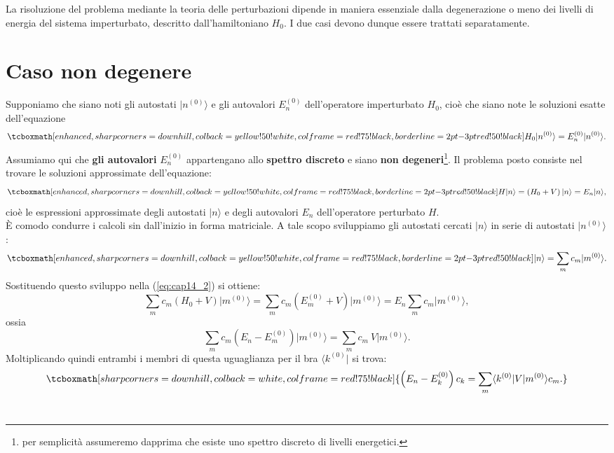 \documentclass[a4paper,12pt,oneside]{book}
\begin{document}
La risoluzione del problema mediante la teoria delle perturbazioni dipende in maniera essenziale dalla degenerazione o meno dei livelli di energia del sistema imperturbato, descritto dall'hamiltoniano $H_0$. I due casi devono dunque essere trattati separatamente.
\section{Caso non degenere}
Supponiamo che siano noti gli autostati $\vert n^{(0)} \rangle$ e gli autovalori $E_n ^{(0)}$ dell'operatore imperturbato $H_0$, cioè che siano note le soluzioni esatte dell'equazione
	\begin{equation}
		\tcboxmath[enhanced, sharp corners=downhill, colback=yellow!50!white, colframe=red!75!black, borderline={2pt}{-3pt}{red!50!black}]{
			H_0\vert n^{(0)} \rangle=E_n ^{(0)}\vert n^{(0)} \rangle.
			}
	\label{eq:cap14_1}
	\end{equation}
Assumiamo qui che \textbf{gli autovalori} $E_n ^{(0)}$ appartengano allo \textbf{spettro discreto} e siano \textbf{non degeneri}\footnote{per semplicità assumeremo dapprima che esiste uno spettro discreto di livelli energetici.}. Il problema posto consiste nel trovare le soluzioni approssimate dell'equazione:
	\begin{equation}
		\tcboxmath[enhanced, sharp corners=downhill, colback=yellow!50!white, colframe=red!75!black, borderline={2pt}{-3pt}{red!50!black}]{
			H\vert n \rangle=\left( H_0+ V \right) \vert n \rangle= E_n \vert n \rangle,
			}
	\label{eq:cap14_2}
	\end{equation}
cioè le espressioni approssimate degli autostati $\vert n \rangle$ e degli autovalori $E_n$ dell'operatore perturbato $H$.\\

È comodo condurre i calcoli sin dall'inizio in forma matriciale. A tale scopo sviluppiamo gli autostati cercati $\vert n \rangle$ in serie di autostati $\vert n^{(0)} \rangle$:
	\begin{equation}
		\tcboxmath[enhanced, sharp corners=downhill, colback=yellow!50!white, colframe=red!75!black, borderline={2pt}{-3pt}{red!50!black}]{
			\vert n \rangle= \sum _m c_m \vert m^{(0)} \rangle.
			}
	\label{eq:cap14_3}
	\end{equation}
Sostituendo questo sviluppo nella (\ref{eq:cap14_2}) si ottiene:
	\begin{equation}
		\sum _m c_m \left( H_0+V\right)\vert m^{(0)} \rangle =\sum _m c_m \left( E_m ^{(0)}+V\right)\vert m^{(0)} \rangle= E_n\sum _m c_m \vert m^{(0)} \rangle,
	\end{equation}
ossia
	\begin{equation}
		\sum _m c_m \left( E_n-E_m ^{(0)}\right)\vert m^{(0)}\rangle=\sum _m c_m\ V\vert m^{(0)}\rangle.
	\end{equation}
Moltiplicando quindi entrambi i membri di questa uguaglianza per il bra $\langle k^{(0)}\vert$ si trova:
	\begin{equation}
		\tcboxmath[sharp corners=downhill, colback=white, colframe=red!75!black]{
			\left( E_n-E_k ^{(0)}\right)c_k =\sum _m \langle k^{(0)}\vert V\vert m^{(0)}\rangle c_m.
			}
	\label{eq:cap14_4}
	\end{equation}\\
	
\end{document}
